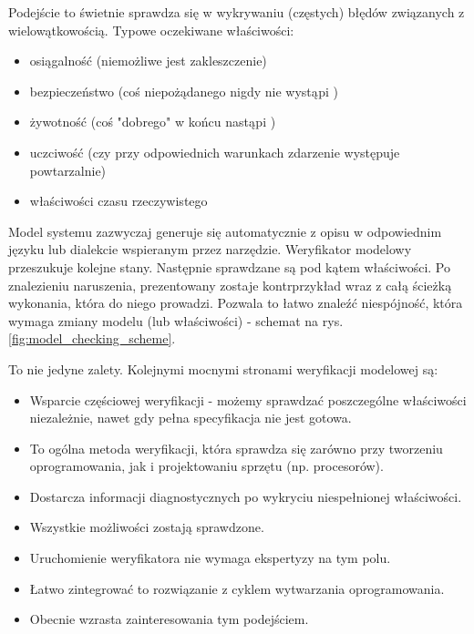 Podejście to świetnie sprawdza się w wykrywaniu (częstych) błędów związanych z wielowątkowością. Typowe oczekiwane właściwości:
\begin{itemize}
\item osiągalność (niemożliwe jest zakleszczenie)
\item bezpieczeństwo (coś niepożądanego nigdy nie wystąpi \cite{Alp87})
\item żywotność (coś "dobrego" w końcu nastąpi \cite{Alp85})
\item uczciwość (czy przy odpowiednich warunkach zdarzenie występuje powtarzalnie)
\item właściwości czasu rzeczywistego
\end{itemize}

\vspace{0.5cm}
Model systemu zazwyczaj generuje się automatycznie z opisu w odpowiednim języku lub dialekcie wspieranym przez narzędzie. 
Weryfikator modelowy przeszukuje kolejne stany. Następnie sprawdzane są pod kątem właściwości. Po znalezieniu naruszenia, prezentowany zostaje kontrprzykład wraz z całą ścieżką wykonania, która do niego prowadzi. Pozwala to łatwo znaleźć niespójność, która wymaga zmiany modelu (lub właściwości) - schemat na rys. \ref{fig:model_checking_scheme}.

\vspace{0.5cm}
\noindent
To nie jedyne zalety. Kolejnymi mocnymi stronami weryfikacji modelowej są:
\begin{itemize}
\item Wsparcie częściowej weryfikacji - możemy sprawdzać poszczególne właściwości niezależnie, nawet gdy pełna specyfikacja nie jest gotowa.
\item To ogólna metoda weryfikacji, która sprawdza się zarówno przy tworzeniu oprogramowania, jak i projektowaniu sprzętu (np. procesorów).
\item Dostarcza informacji diagnostycznych po wykryciu niespełnionej właściwości.
\item Wszystkie możliwości zostają sprawdzone.
\item Uruchomienie weryfikatora nie wymaga ekspertyzy na tym polu.
\item Łatwo zintegrować to rozwiązanie z cyklem wytwarzania oprogramowania.
\item Obecnie wzrasta zainteresowania tym podejściem.
\end{itemize}

